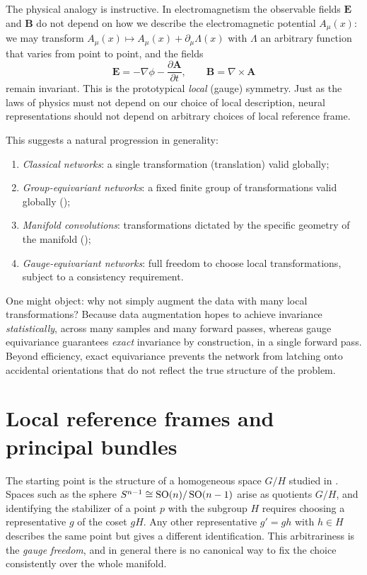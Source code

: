 The physical analogy is instructive. In electromagnetism the observable fields
$\mathbf{E}$ and $\mathbf{B}$ do not depend on how we describe the
electromagnetic potential $A_\mu(x)$: we may transform
$A_\mu(x) \mapsto A_\mu(x) + \partial_\mu \Lambda(x)$ with $\Lambda$ an
arbitrary function that varies from point to point, and the fields
\[
  \mathbf{E} = -\nabla \phi - \frac{\partial \mathbf{A}}{\partial t},
  \qquad
  \mathbf{B} = \nabla \times \mathbf{A}
\]
remain invariant. This is the prototypical \emph{local} (gauge) symmetry. Just
as the laws of physics must not depend on our choice of local description,
neural representations should not depend on arbitrary choices of local reference
frame.

This suggests a natural progression in generality:
\begin{enumerate}
  \item \emph{Classical networks}: a single transformation (translation) valid
    globally;
  \item \emph{Group-equivariant networks}: a fixed finite group of
    transformations valid globally ();
  \item \emph{Manifold convolutions}: transformations dictated by the specific
    geometry of the manifold ();
  \item \emph{Gauge-equivariant networks}: full freedom to choose local
    transformations, subject to a consistency requirement.
\end{enumerate}

One might object: why not simply augment the data with many local
transformations? Because data augmentation hopes to achieve invariance
\emph{statistically}, across many samples and many forward passes, whereas gauge
equivariance guarantees \emph{exact} invariance by construction, in a single
forward pass. Beyond efficiency, exact equivariance prevents the network from
latching onto accidental orientations that do not reflect the true structure of
the problem.

\section{Local reference frames and principal bundles}
\label{sec:gauge:bundles}

The starting point is the structure of a homogeneous space $G/H$ studied in
. Spaces such as the sphere $S^{n-1} \cong \operatorname{SO}(n)/\operatorname{SO}(n-1)$
arise as quotients $G/H$, and identifying the stabilizer of a point $p$ with the
subgroup $H$ requires choosing a representative $g$ of the coset $gH$. Any other
representative $g' = gh$ with $h \in H$ describes the same point but gives a
different identification. This arbitrariness is the \emph{gauge freedom}, and in
general there is no canonical way to fix the choice consistently over the whole
manifold.

